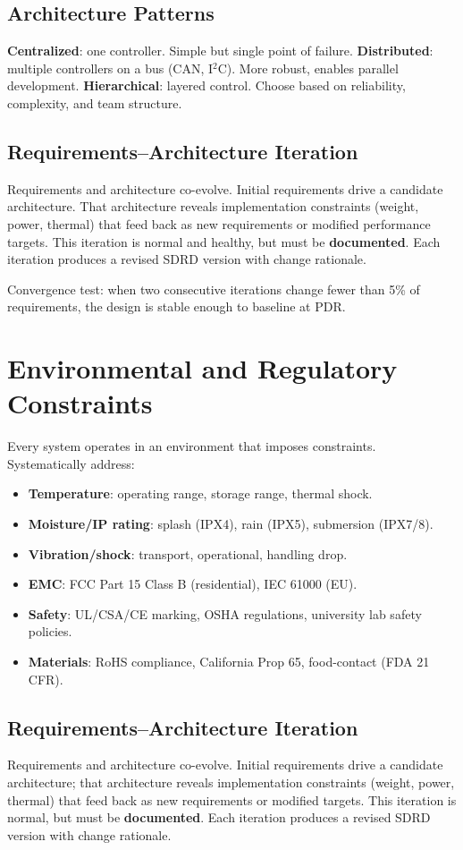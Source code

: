 \documentclass[11pt,letterpaper,twoside,openany]{book}
\begin{document}
\subsection{Architecture Patterns}
\textbf{Centralized}: one controller. Simple but single point of failure. \textbf{Distributed}: multiple controllers on a bus (CAN, I$^2$C). More robust, enables parallel development. \textbf{Hierarchical}: layered control. Choose based on reliability, complexity, and team structure.


\subsection{Requirements--Architecture Iteration}
Requirements and architecture co-evolve. Initial requirements drive a candidate architecture. That architecture reveals implementation constraints (weight, power, thermal) that feed back as new requirements or modified performance targets. This iteration is normal and healthy, but must be \textbf{documented}. Each iteration produces a revised SDRD version with change rationale.

Convergence test: when two consecutive iterations change fewer than 5\% of requirements, the design is stable enough to baseline at PDR.

\section{Environmental and Regulatory Constraints}
Every system operates in an environment that imposes constraints. Systematically address:
\begin{itemize}[nosep,leftmargin=1.5em]
\item \textbf{Temperature}: operating range, storage range, thermal shock.
\item \textbf{Moisture/IP rating}: splash (IPX4), rain (IPX5), submersion (IPX7/8).
\item \textbf{Vibration/shock}: transport, operational, handling drop.
\item \textbf{EMC}: FCC Part 15 Class B (residential), IEC 61000 (EU).
\item \textbf{Safety}: UL/CSA/CE marking, OSHA regulations, university lab safety policies.
\item \textbf{Materials}: RoHS compliance, California Prop 65, food-contact (FDA 21 CFR).
\end{itemize}


\subsection{Requirements--Architecture Iteration}
Requirements and architecture co-evolve. Initial requirements drive a candidate architecture; that architecture reveals implementation constraints (weight, power, thermal) that feed back as new requirements or modified targets. This iteration is normal, but must be \textbf{documented}. Each iteration produces a revised SDRD version with change rationale.
\end{document}
